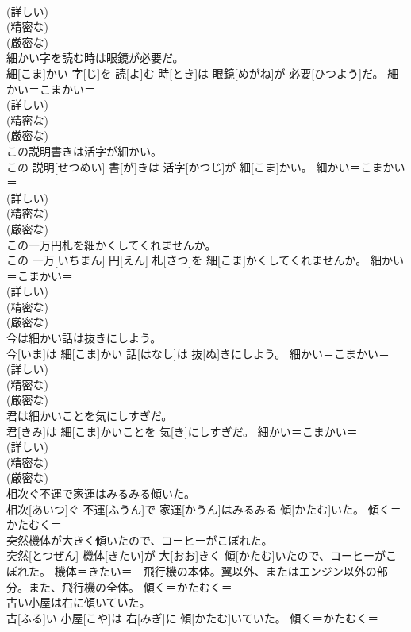 \documentclass[8pt]{extreport}
\begin{document}
\begin{CJK}{UTF8}{min}
{\\	(詳しい) 
\\	(精密な) 
\\	(厳密な) 
\\	細かい字を読む時は眼鏡が必要だ。	
\\	細[こま]かい 字[じ]を 読[よ]む 時[とき]は 眼鏡[めがね]が 必要[ひつよう]だ。	細かい＝こまかい＝ 
\\	(詳しい) 
\\	(精密な) 
\\	(厳密な) 
\\	この説明書きは活字が細かい。	
\\	この 説明[せつめい] 書[が]きは 活字[かつじ]が 細[こま]かい。	細かい＝こまかい＝ 
\\	(詳しい) 
\\	(精密な) 
\\	(厳密な) 
\\	この一万円札を細かくしてくれませんか。	
\\	この 一万[いちまん] 円[えん] 札[さつ]を 細[こま]かくしてくれませんか。	細かい＝こまかい＝ 
\\	(詳しい) 
\\	(精密な) 
\\	(厳密な) 
\\	今は細かい話は抜きにしよう。	
\\	今[いま]は 細[こま]かい 話[はなし]は 抜[ぬ]きにしよう。	細かい＝こまかい＝ 
\\	(詳しい) 
\\	(精密な) 
\\	(厳密な) 
\\	君は細かいことを気にしすぎだ。	
\\	君[きみ]は 細[こま]かいことを 気[き]にしすぎだ。	細かい＝こまかい＝ 
\\	(詳しい) 
\\	(精密な) 
\\	(厳密な) 
\\	相次ぐ不運で家運はみるみる傾いた。	
\\	相次[あいつ]ぐ 不運[ふうん]で 家運[かうん]はみるみる 傾[かたむ]いた。	傾く＝かたむく＝ 
\\	突然機体が大きく傾いたので、コーヒーがこぼれた。	
\\	突然[とつぜん] 機体[きたい]が 大[おお]きく 傾[かたむ]いたので、コーヒーがこぼれた。	機体＝きたい＝　飛行機の本体。翼以外、またはエンジン以外の部分。また、飛行機の全体。 傾く＝かたむく＝ 
\\	古い小屋は右に傾いていた。	
\\	古[ふる]い 小屋[こや]は 右[みぎ]に 傾[かたむ]いていた。	傾く＝かたむく＝ 
}
\end{CJK}
\end{document}

